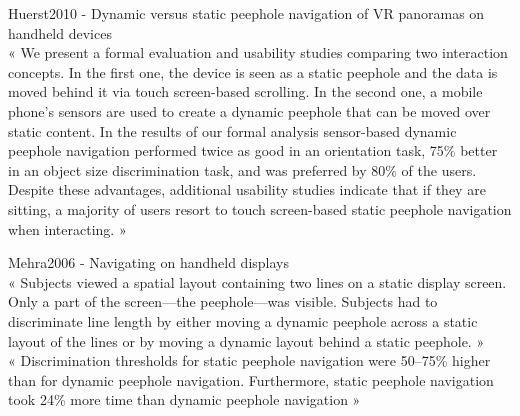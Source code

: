 Huerst2010 - Dynamic versus static peephole navigation of VR panoramas on handheld devices\\
« We present a formal evaluation and usability studies comparing two interaction concepts. In the first one, the device is seen as a static peephole and the data is moved behind it via touch screen-based scrolling. In the second one, a mobile phone’s sensors are used to create a dynamic peephole that can be moved over static content. In the results of our formal analysis sensor-based dynamic peephole navigation performed twice as good in an orientation task, 75\% better in an object size discrimination task, and was preferred by 80\% of the users. Despite these advantages, additional usability studies indicate that if they are sitting, a majority of users resort to touch screen-based static peephole navigation when interacting. »

Mehra2006 - Navigating on handheld displays\\
« Subjects viewed a spatial layout containing two lines on a static display screen. Only a part of the screen—the peephole—was visible. Subjects had to discriminate line length by either moving a dynamic peephole across a static layout of the lines or by moving a dynamic layout behind a static peephole. »\\
« Discrimination thresholds for static peephole navigation were 50–75\% higher than for dynamic peephole navigation. Furthermore, static peephole navigation took 24\% more time than dynamic peephole navigation »